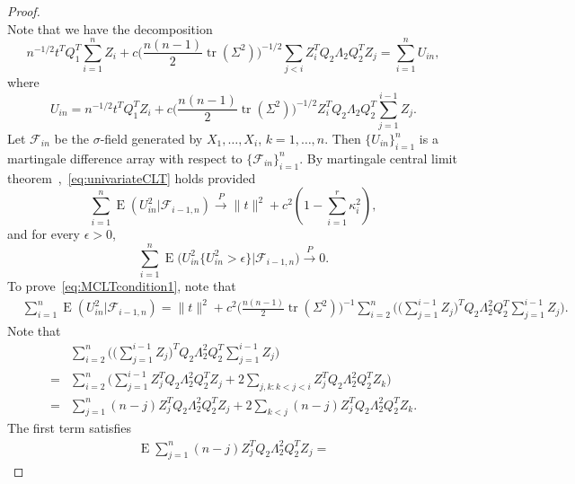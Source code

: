 \documentclass[review]{elsarticle}
\DeclareMathOperator{\mytr}{tr}
\DeclareMathOperator{\myE}{E}
\theoremstyle{plain}
\theoremstyle{definition}
\theoremstyle{remark}
\begin{document}
\begin{proof}
\begin{equation}
    \end{equation}
    Note that we have the decomposition
    $$
    n^{-1/2} t^T Q_1^T \sum_{i=1}^n Z_i+c\big(\frac{n(n-1)}{2} \mytr(\Sigma^2)\big)^{-1/2}\sum_{j<i}Z_i^T Q_2 \Lambda_2 Q_2^T Z_j
    =\sum_{i=1}^n U_{in},
    $$
    where 
    $$U_{in}=
    n^{-1/2} t^T Q_1^T Z_i+c \big(\frac{n(n-1)}{2} \mytr(\Sigma^2)\big)^{-1/2} Z_i^T Q_2 \Lambda_2 Q_2^T \sum_{j=1}^{i-1}Z_j.
    $$
    Let $\mathcal{F}_{in}$ be the $\sigma$-field generated by $X_1,\dots, X_i$, $k=1,\ldots,n$.
    Then $\{U_{in}\}_{i=1}^n$ is a martingale difference array with respect to $\{\mathcal{F}_{in}\}_{i=1}^n$.
    By martingale central limit theorem~\citep[Chapter VIII, Theorem 1]{pollard1984convergence},~\eqref{eq:univariateCLT} holds provided
     \begin{equation}\label{eq:MCLTcondition1}
         \sum_{i=1}^n \myE(U_{in}^2 |\mathcal{F}_{i-1,n})\xrightarrow{P} \|t\|^2 + c^2(1-\sum_{i=1}^r \kappa_i^2),
     \end{equation}
     and for every $\epsilon>0$,
     \begin{equation}\label{eq:MCLTcondition2}
         \sum_{i=1}^n \myE\big(U_{in}^2\big\{U_{in}^2>\epsilon \big\}\big|\mathcal{F}_{i-1,n}\big)\xrightarrow{P} 0.
     \end{equation}
    To prove~\eqref{eq:MCLTcondition1}, note that
     $$
     \begin{aligned}
         &\sum_{i=1}^n \myE(U_{in}^2 |\mathcal{F}_{i-1,n})    
     =\|t\|^2+c^2 \big(\frac{n(n-1)}{2} \mytr(\Sigma^2)\big)^{-1}\sum_{i=2}^n \Big(\big(\sum_{j=1}^{i-1} Z_{j}\big)^T Q_2 \Lambda_2^2 Q_2^T \sum_{j=1}^{i-1} Z_{j}\Big).
     \end{aligned}
     $$
     Note that
     $$
     \begin{aligned}
         &\sum_{i=2}^n \Big(\big(\sum_{j=1}^{i-1} Z_{j}\big)^T Q_2 \Lambda_2^2 Q_2^T \sum_{j=1}^{i-1} Z_{j}\Big)
         \\
         =&
    \sum_{i=2}^n \Big(
         \sum_{j=1}^{i-1} Z_{j}^T Q_2 \Lambda_2^2 Q_2^T  Z_{j}
         +
         2\sum_{j,k:k<j<i}Z_{j}^T Q_2 \Lambda_2^2 Q_2^T  Z_{k}
         \Big)
         \\
         =&
         \sum_{j=1}^{n} (n-j) Z_{j}^T Q_2 \Lambda_2^2 Q_2^T  Z_{j}
         +
         2\sum_{k<j} (n-j) Z_{j}^T Q_2 \Lambda_2^2 Q_2^T  Z_{k}
         .
     \end{aligned}
     $$
     The first term satisfies
     $$
     \begin{aligned}
\myE\sum_{j=1}^{n} (n-j) Z_{j}^T Q_2 \Lambda_2^2 Q_2^T  Z_{j}=

\end{aligned}$$
\end{proof}
\end{document}

